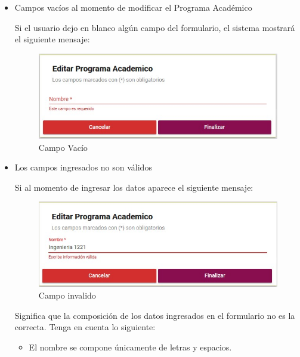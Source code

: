             \begin{itemize}
                \item Campos vacíos al momento de modificar el Programa Académico

                    Si el usuario dejo en blanco algún campo del formulario, el sistema mostrará el siguiente mensaje:

                    \begin{figure}[H]
                    \centering
                    \hypertarget{vacio}{\includegraphics[width=0.7\linewidth]{images/SP3/Vacio}}
                    \caption{Campo Vacío}
                    \label{vacio}
                    \end{figure}

                \item Los campos ingresados no son válidos

                    Si al momento de ingresar los datos aparece el siguiente mensaje:

                     \begin{figure}[H]
                    \centering
                    \hypertarget{invalido}{\includegraphics[width=0.7\linewidth]{images/SP3/Invalida}}
                    \caption{Campo invalido}
                    \label{invalido}
                    \end{figure}


                    Significa que la composición de los datos ingresados en el formulario no es la correcta. Tenga en cuenta lo siguiente:

                    \begin{itemize}
                        \item El nombre se compone únicamente de letras y espacios.


\end{itemize}
\end{itemize}
